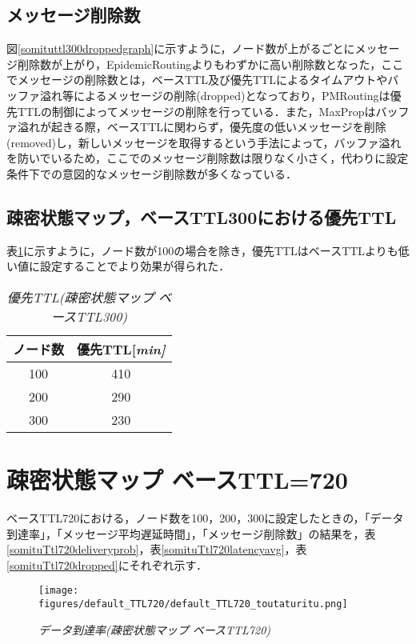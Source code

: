 \documentclass[11pt]{icsthesis}
\begin{document}
\subsection{メッセージ削除数}
図\ref{somituttl300droppedgraph}に示すように，ノード数が上がるごとにメッセージ削除数が上がり，EpidemicRoutingよりもわずかに高い削除数となった，ここでメッセージの削除数とは，ベースTTL及び優先TTLによるタイムアウトやバッファ溢れ等によるメッセージの削除(dropped)となっており，PMRoutingは優先TTLの制御によってメッセージの削除を行っている．また，MaxPropはバッファ溢れが起きる際，ベースTTLに関わらず，優先度の低いメッセージを削除(removed)し，新しいメッセージを取得するという手法によって，バッファ溢れを防いでいるため，ここでのメッセージ削除数は限りなく小さく，代わりに設定条件下での意図的なメッセージ削除数が多くなっている．\\
\subsection{疎密状態マップ，ベースTTL300における優先TTL}
表\ref{priorityTTL_somitsu300}に示すように，ノード数が100の場合を除き，優先TTLはベースTTLよりも低い値に設定することでより効果が得られた．
\begin{table}[H]
	\begin{center}
			 \caption[]{\it{優先TTL(疎密状態マップ ベースTTL300)}}
			 \label{priorityTTL_somitsu300}
			 \begin{tabular}{|c|c|}
 \hline
 ノード数&優先TTL[\it{min}]\\
 \hline
 100&410\\
 \hline
 200&290\\
 \hline
 300&230\\
 \hline
			 \end{tabular}
		 \end{center}
 \end{table}
\newpage

\section{疎密状態マップ ベースTTL=720}
ベースTTL720における，ノード数を100，200，300に設定したときの，「データ到達率」，「メッセージ平均遅延時間」，「メッセージ削除数」の結果を，表\ref{somituTtl720deliveryprob}，表\ref{somituTtl720latencyavg}，表\ref{somituTtl720dropped}にそれぞれ示す．

\begin{figure}[h]
\centering
\texttt{[image: figures/default\_TTL720/default\_TTL720\_toutaturitu.png]}
\caption[]{\it{データ到達率(疎密状態マップ ベースTTL720)}}
\label{somituttl720deliveryprobgraph}
\end{figure}
\end{document}
